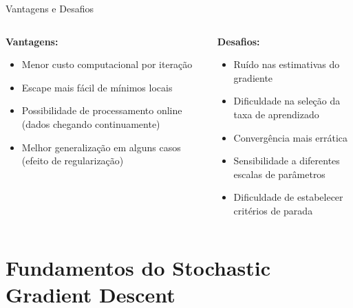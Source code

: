 \documentclass[aspectratio=1610]{beamer}
\begin{document}
\begin{frame}{Vantagens e Desafios}
\begin{columns}
\begin{column}{0.5\textwidth}
\textbf{Vantagens:}
\begin{itemize}
    \item Menor custo computacional por iteração \pause
    \item Escape mais fácil de mínimos locais \pause
    \item Possibilidade de processamento online (dados chegando continuamente) \pause
    \item Melhor generalização em alguns casos (efeito de regularização)
\end{itemize}
\end{column}

\begin{column}{0.5\textwidth}
\textbf{Desafios:} \pause
\begin{itemize}
    \item Ruído nas estimativas do gradiente \pause
    \item Dificuldade na seleção da taxa de aprendizado \pause
    \item Convergência mais errática \pause
    \item Sensibilidade a diferentes escalas de parâmetros \pause
    \item Dificuldade de estabelecer critérios de parada
\end{itemize}
\end{column}
\end{columns}
\end{frame}

\section{Fundamentos do Stochastic Gradient Descent}
\end{document}
